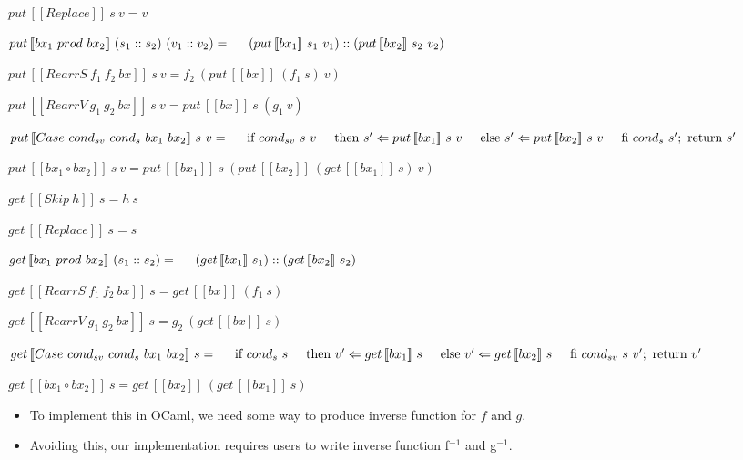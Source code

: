 \documentclass[runningheads]{llncs}
\newcommand{\tab}{\hspace*{5mm}}
\newcommand{\product}[2]{#1 \ prod \ #2}
\newcommand{\rearrs}[3]{RearrS \ #1 \ #2 \ #3}
\newcommand{\rearrv}[3]{RearrV \ #1 \ #2 \ #3}
\newcommand{\casebx}[4]{Case \ #1 \ #2 \ #3 \ #4}
\newcommand{\putbx}[3]{put \, [\![#1]\!] \ #2 \ #3}
\newcommand{\getbx}[2]{get \, [\![#1]\!] \ #2}
\begin{document}
$\putbx{Replace}{s}{v} = v$

$\putbx{\product{bx_1}{bx_2}}{(s_1 :: s_2)}{(v_1 :: v_2)} =\\
    \tab (\putbx{bx_1}{s_1}{v_1}) :: (\putbx{bx_2}{s_2}{v_2})$

$\putbx{\rearrs{f_1}{f_2}{bx}}{s}{v} = f_2 \ (\putbx{bx}{(f_1 \ s)}{v})$

$\putbx{\rearrv{g_1}{g_2}{bx}}{s}{v} = \putbx{bx}{s}{(g_1 \ v)}$

$\putbx{\casebx{cond_{sv}}{cond_{s}}{bx_1}{bx_2}}{s}{v} = \\
    \tab \text{if} \ {cond_{sv} \ s \ v} \\
    \tab \text{then} \ s' \Leftarrow \putbx{bx_1}{s}{v} \\
    \tab \text{else} \ s' \Leftarrow \putbx{bx_2}{s}{v} \\
    \tab \text{fi} \ cond_{s} \ s'; \ \text{return} \ s'$

$\putbx{bx_1 \circ bx_2}{s}{v} = \putbx{bx_1}{s}{(\putbx{bx_2}{(\getbx{bx_1}{s})}{v})}$

\vspace{5mm}

$\getbx{Skip \ h}{s} = h \ s$

$\getbx{Replace}{s} = s$

$\getbx{\product{bx_1}{bx_2}}{(s_1 :: s_2)} = \\
    \tab (\getbx{bx_1}{s_1}) :: (\getbx{bx_2}{s_2})$

$\getbx{\rearrs{f_1}{f_2}{bx}}{s} = \getbx{bx}{(f_1 \ s)}$

$\getbx{\rearrv{g_1}{g_2}{bx}}{s} = g_2 \ (\getbx{bx}{s})$

$\getbx{\casebx{cond_{sv}}{cond_{s}}{bx_1}{bx_2}}{s} =\\
    \tab \text{if} \ {cond_{s} \ s}\\
    \tab \text{then} \ v' \Leftarrow \getbx{bx_1}{s}\\
    \tab \text{else} \ v' \Leftarrow \getbx{bx_2}{s}\\
    \tab \text{fi} \ {cond_{sv} \ s \ v'}; \ \text{return} \ v'$

$\getbx{bx_1 \circ bx_2}{s} = \getbx{bx_2}{(\getbx{bx_1}{s})}$

\begin{itemize}
\item To implement this in OCaml, we need some way to produce inverse function for $f$ and $g$.
\item Avoiding this, our implementation requires users to write inverse function f$^{-1}$ and g$^{-1}$.
\end{itemize}
\end{document}
